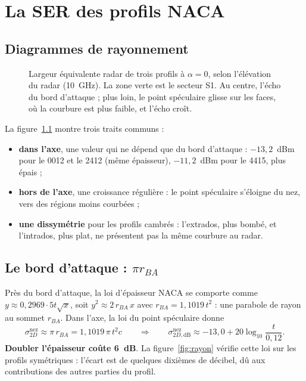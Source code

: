 \chapter{La SER des profils NACA}\label{ch:naca}

\section{Diagrammes de rayonnement}
\begin{figure}[htbp]
\centering

\caption{Largeur équivalente radar de trois profils à $\alpha=0$, selon l'élévation du radar (10~GHz). La zone verte est le secteur S1. Au centre, l'écho du bord d'attaque ; plus loin, le point spéculaire glisse sur les faces, où la courbure est plus faible, et l'écho croît.}\label{fig:diagrammes}
\end{figure}

La figure~\ref{fig:diagrammes} montre trois traits communs :
\begin{itemize}
\item \textbf{dans l'axe}, une valeur qui ne dépend que du bord d'attaque : $-13{,}2$~dBm pour le 0012 et le 2412 (même épaisseur), $-11{,}2$~dBm pour le 4415, plus épais ;
\item \textbf{hors de l'axe}, une croissance régulière : le point spéculaire s'éloigne du nez, vers des régions moins courbées ;
\item \textbf{une dissymétrie} pour les profils cambrés : l'extrados, plus bombé, et l'intrados, plus plat, ne présentent pas la même courbure au radar.
\end{itemize}

\section{Le bord d'attaque : $\pi r_{BA}$}
Près du bord d'attaque, la loi d'épaisseur NACA se comporte comme $y\approx0{,}2969\cdot5t\sqrt x$, soit $y^2\approx2\,r_{BA}\,x$ avec $r_{BA}=1{,}1019\,t^2$ : une parabole de rayon au sommet $r_{BA}$. Dans l'axe, la loi du point spéculaire donne
\[
\sigma_{2D}^{\text{nez}}\approx\pi\,r_{BA}=1{,}1019\,\pi\,t^2c\qquad\Longrightarrow\qquad
\sigma_{2D,\mathrm{dB}}^{\text{nez}}\approx-13{,}0+20\log_{10}\frac{t}{0{,}12}.
\]
\textbf{Doubler l'épaisseur coûte 6~dB}. La figure~\ref{fig:rayon} vérifie cette loi sur les profils symétriques : l'écart est de quelques dixièmes de décibel, dû aux contributions des autres parties du profil.

